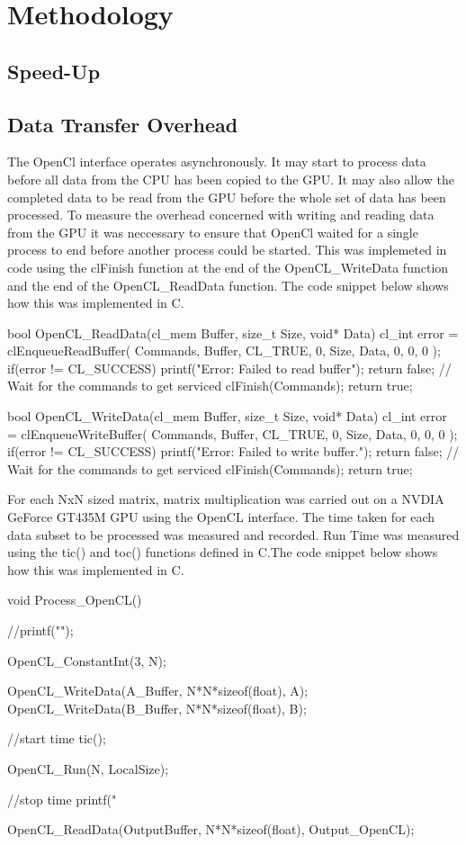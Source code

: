 \section{Methodology}

\subsection{Speed-Up}

\subsection{Data Transfer Overhead}
The OpenCl interface operates asynchronously. It may start to process data before all data from the CPU has been copied to the GPU. It may also allow the completed data to be read from the GPU before the whole set of data has been processed. To measure the overhead concerned with writing and reading data from the GPU it was neccessary to ensure that OpenCl waited for a single process to end before another process could be started. This was implemeted in code using the clFinish function at the end of the OpenCL\_WriteData function and the end of the OpenCL\_ReadData function. The code snippet below shows how this was implemented in C.

\begin{Cpp}
bool OpenCL_ReadData(cl_mem Buffer, size_t Size, void* Data){
	cl_int error = clEnqueueReadBuffer(
	Commands,
	Buffer,
	CL_TRUE,
	0,
	Size,
	Data,
	0, 0, 0
	);
	if(error != CL_SUCCESS){
		printf("Error: Failed to read buffer\n");
		return false;
	}
	// Wait for the commands to get serviced
	clFinish(Commands);
	return true;
}

bool OpenCL_WriteData(cl_mem Buffer, size_t Size, void* Data){
	cl_int error = clEnqueueWriteBuffer(
	Commands,
	Buffer,
	CL_TRUE,
	0,
	Size,
	Data,
	0, 0, 0
	);
	if(error != CL_SUCCESS){
		printf("Error: Failed to write buffer.\n");
		return false;
	}
	// Wait for the commands to get serviced
	clFinish(Commands);
	return true;
}
\end{Cpp}

For each NxN sized matrix, matrix multiplication was carried out on a NVDIA GeForce GT435M GPU using the OpenCL interface. The time taken for each data subset to be processed was measured and recorded. Run Time was measured using the tic() and toc() functions defined in C.The code snippet below shows how this was implemented in C.

\begin{Cpp}


void Process_OpenCL(){
	//printf("\n");
	
	OpenCL_ConstantInt(3, N);
	
	OpenCL_WriteData(A_Buffer, N*N*sizeof(float), A);
	OpenCL_WriteData(B_Buffer, N*N*sizeof(float), B);
	
	//start time
	tic();
	
	OpenCL_Run(N, LocalSize);
	
	//stop time
	printf("%
	
	OpenCL_ReadData(OutputBuffer, N*N*sizeof(float), Output_OpenCL);
}
		
\end{Cpp}

